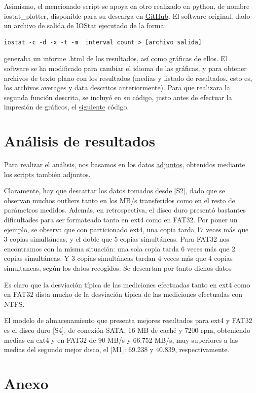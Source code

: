 \documentclass[a4paper,10pt]{article}
\renewcommand{\texttt}[2][black!60]{\textcolor{#1}{\ttfamily #2}}
\begin{document}
Asimismo, el mencionado script se apoya en otro realizado en \texttt{python}, de nombre \texttt{iostat\_plotter}, disponible
para su descarga en \href{https://github.com/s3h10r/iostat-plotter}{GitHub}. El software original, dado  un archivo
de salida de IOStat ejecutado de la forma:
\begin{lstlisting}[style=BashInputStyle]
 iostat -c -d -x -t -m  interval count > [archivo salida]
\end{lstlisting}
generaba un informe \texttt{.html} de los resultados, así como gráficas de ellos. El software se ha modificado
para cambiar el idioma de las gráficas, y para obtener archivos de texto plano con los resultados (medias y listado
de resultados, esto es, los archivos \texttt{averages} y \texttt{data} descritos anteriormente). Para que realizara
la segunda función descrita, se incluyó en su código, justo antes de efectuar la impresión de gráficos, el \hyperlink{pyscript}{siguiente}
código.
 \section{Análisis de resultados}
 Para realizar el análisis, nos basamos en los datos \hyperlink{tablas}{adjuntos}, obtenidos mediante los scripts también adjuntos.
 
 Claramente, hay que descartar los datos tomados desde [S2], dado que se observan muchos outliers tanto en los MB/s
 transferidos como en el resto de parámetros medidos. Además, en retrospectiva, el disco duro presentó bastantes 
 dificultades para ser formateado tanto en ext4 como en FAT32. Por poner un ejemplo, se observa que con particionado
 ext4, una copia tarda 17 veces más que 3 copias simultáneas, y el doble que 5 copias simultáneas. Para FAT32 nos
 encontramos con la misma situación: una sola copia tarda 6 veces más que 2 copias simultáneas. Y 3 copias simultáneas tardan
 4 veces más que 4 copias simultaneas, según los datos recogidos. Se descartan por tanto dichos datos 
 
 Es claro que la desviación típica de las mediciones efectuadas tanto en ext4 como en FAT32 dista mucho de la
 desviación típica de las mediciones efectuadas con NTFS.
 
 El modelo de almacenamiento que presenta mejores resultados para ext4 y FAT32 es el disco duro [S4], de conexión
 SATA, 16 MB de caché y 7200 rpm, obteniendo medias en ext4 y en FAT32 de 90 MB/s y 66.752 MB/s, muy superiores
 a las medias del segundo mejor disco, el [M1]: 69.238 y 40.839, respectivamente.
 \newpage
 \section*{Anexo} 
\end{document}
